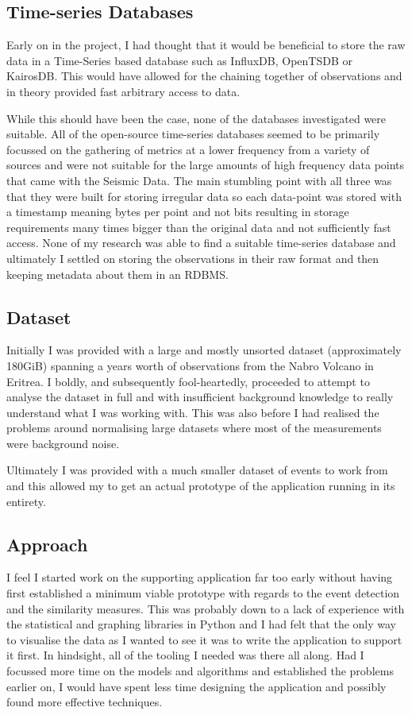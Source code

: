 \documentclass[../report.tex]{subfiles}
\begin{document}
\subsection{Time-series Databases}
	Early on in the project, I had thought that it would be beneficial to store the raw data in a Time-Series based database such as InfluxDB, OpenTSDB or KairosDB.  This would have allowed for the chaining together of observations and in theory provided fast arbitrary access to data.
	
	While this should have been the case, none of the databases investigated were suitable.  All of the open-source time-series databases seemed to be primarily focussed on the gathering of metrics at a lower frequency from a variety of sources and were not suitable for the large amounts of high frequency data points that came with the Seismic Data.  The main stumbling point with all three was that they were built for storing irregular data so each data-point was stored with a timestamp meaning bytes per point and not bits resulting in storage requirements many times bigger than the original data and not sufficiently fast access.  None of my research was able to find a suitable time-series database and ultimately I settled on storing the observations in their raw format and then keeping metadata about them in an RDBMS.
	
\subsection{Dataset}
	Initially I was provided with a large and mostly unsorted dataset (approximately 180GiB) spanning a years worth of observations from the Nabro Volcano in Eritrea.  I boldly, and subsequently fool-heartedly, proceeded to attempt to analyse the dataset in full and with insufficient background knowledge to really understand what I was working with.  This was also before I had realised the problems around normalising large datasets where most of the measurements were background noise.
	
	Ultimately I was provided with a much smaller dataset of events to work from and this allowed my to get an actual prototype of the application running in its entirety.
	
\subsection{Approach} \label{sec:ce-approach}

	I feel I started work on the supporting application far too early without having first established a minimum viable prototype with regards to the event detection and the similarity measures.  This was probably down to a lack of experience with the statistical and graphing libraries in Python and I had felt that the only way to visualise the data as I wanted to see it was to write the application to support it first.  In hindsight, all of the tooling I needed was there all along.  Had I focussed more time on the models and algorithms and established the problems earlier on, I would have spent less time designing the application and possibly found more effective techniques.
	
\end{document}
